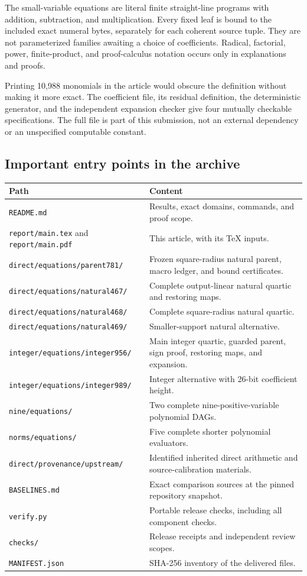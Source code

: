 \documentclass[11pt,letterpaper]{article}
\theoremstyle{definition}
\theoremstyle{remark}
\newcommand{\file}[1]{\nolinkurl{#1}}
\begin{document}
The small-variable equations are literal finite straight-line programs
with addition, subtraction, and multiplication. Every fixed leaf is
bound to the included exact numeral bytes, separately for each
coherent source tuple. They are not parameterized families awaiting
a choice of coefficients. Radical, factorial, power, finite-product,
and proof-calculus notation occurs only in explanations and proofs.

Printing 10,988 monomials in the article would obscure the definition
without making it more exact. The coefficient file, its residual
definition, the deterministic generator, and the independent expansion
checker give four mutually checkable specifications. The full file is
part of this submission, not an external dependency or an unspecified
computable constant.

\subsection{Important entry points in the archive}

\begin{longtable}{@{}p{}p{}@{}}
\toprule
Path & Content\\
\midrule\endhead
\file{README.md} & Results, exact domains, commands, and proof scope.\\
\file{report/main.tex} and \file{report/main.pdf} & This article, with its TeX inputs.\\
\file{direct/equations/parent781/} & Frozen square-radius natural parent, macro ledger, and bound certificates.\\
\file{direct/equations/natural467/} & Complete output-linear natural quartic and restoring maps.\\
\file{direct/equations/natural468/} & Complete square-radius natural quartic.\\
\file{direct/equations/natural469/} & Smaller-support natural alternative.\\
\file{integer/equations/integer956/} & Main integer quartic, guarded parent, sign proof, restoring maps, and expansion.\\
\file{integer/equations/integer989/} & Integer alternative with 26-bit coefficient height.\\
\file{nine/equations/} & Two complete nine-positive-variable polynomial DAGs.\\
\file{norms/equations/} & Five complete shorter polynomial evaluators.\\
\file{direct/provenance/upstream/} & Identified inherited direct arithmetic and source-calibration materials.\\
\file{BASELINES.md} & Exact comparison sources at the pinned repository snapshot.\\
\file{verify.py} & Portable release checks, including all component checks.\\
\file{checks/} & Release receipts and independent review scopes.\\
\file{MANIFEST.json} & SHA-256 inventory of the delivered files.\\
\bottomrule
\end{longtable}
\end{document}
